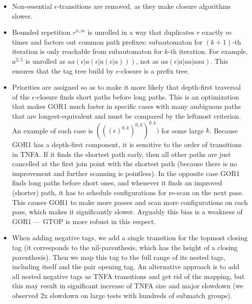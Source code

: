 \documentclass[AMA,STIX1COL]{WileyNJD-v2}
\begin{document}
\begin{itemize}[itemsep=0.5em]
    \item Non-essential $\epsilon$-transitions are removed, as they make closure algorithms slower.

    \item Bounded repetition $r^{n,m}$ is unrolled in a way
        that duplicates $r$ exactly $m$ times %
        and factors out common path prefixes:
        subautomaton for $(k+1)$-th iteration is only reachable from subautomaton for $k$-th iteration.
        For example, $a^{2,5}$ is unrolled as $aa(\epsilon | a (\epsilon | a (\epsilon | a)))$, not as $aa(\epsilon|a|aa|aaa)$.
        This ensures that the tag tree build by $\epsilon$-closure is a prefix tree.

    \item Priorities are assigned so as to make it more likely
        that depth-first traversal of the $\epsilon$-closure finds short paths before long paths.
        This is an optimization that makes GOR1 much faster in specific cases
        with many ambiguous paths that are longest-equivalent and must be compared by the leftmost criterion.
        An example of such case is $(((\epsilon)^{0,k})^{0,k})^{0,k})$ for some large $k$.
        Because GOR1 has a depth-first component, it is sensitive to the order of transitions in TNFA.
        If it finds the shortest path early, then all other paths are just cancelled at the first join point with the shortest path
        (because there is no improvement and further scanning is pointless).
        In the opposite case GOR1 finds long paths before short ones,
        and whenever it finds an improved (shorter) path, it has to schedule configurations for re-scan on the next pass.
        This causes GOR1 to make more passes and scan more configurations on each pass,
        which makes it significantly slower.
        Arguably this bias is a weakness of GOR1 --- GTOP is more robust in this respect.

    \item When adding negative tags, we add a single transition for the topmost closing tag
        (it corresponds to the nil-parenthesis, which has the height of a closing parenthesis).
        Then we map this tag to the full range of its nested tags, including itself and the pair opening tag.
        An alternative approach is to add all nested negative tags as TNFA transitions and get rid of the mapping,
        but this may result in significant increase of TNFA size and major slowdown
        (we observed 2x slowdown on large tests with hundreds of submatch groups).


\end{itemize}
\end{document}
